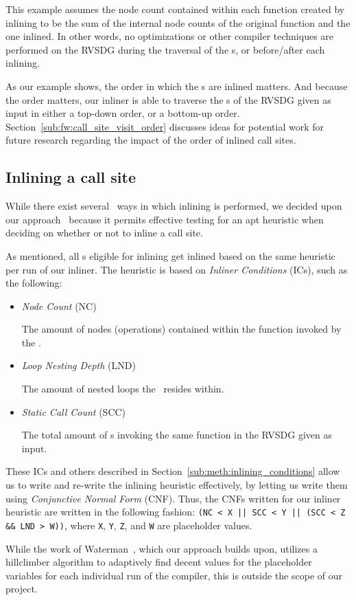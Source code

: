 This example assumes the node count contained within each function created by
inlining to be the sum of the internal node counts of the original function and
the one inlined. In other words, no optimizations or other compiler techniques
are performed on the RVSDG during the traversal of the \applyNode s, or
before/after each inlining.

As our example shows, the order in which the \applyNode s are inlined matters.
And because the order matters, our inliner is able to traverse the \applyNode s
of the RVSDG given as input in either a top-down order, or a bottom-up order.
Section~\ref{sub:fw:call_site_visit_order} discusses ideas for potential work
for future research regarding the impact of the order of inlined call sites.

\subsection{Inlining a call site}
\label{sub:scheme:inlining_apply_nodes}

While there exist several~\cite{GHCPaper,AdaptvStratInlSubst} ways in which
inlining is performed, we decided upon our
approach~\cite{AdaptvCompilAndInlingWaterman} because it permits effective
testing for an apt heuristic when deciding on whether or not to inline a call
site.

As mentioned, all \applyNode s eligible for inlining get inlined based on the
same heuristic per run of our inliner. The heuristic is based on \textit{Inliner
Conditions} (ICs), such as the following:

\begin{itemize}
	\item \textit{Node Count} (NC)

The amount of nodes (operations) contained within the function invoked by the
\applyNode .

	\item \textit{Loop Nesting Depth} (LND)

The amount of nested loops the \applyNode~resides within.

	\item \textit{Static Call Count} (SCC)

The total amount of \applyNode s invoking the same function in the RVSDG given
as input.
\end{itemize}

These ICs and others described in Section~\ref{sub:meth:inlining_conditions}
allow us to write and re-write the inlining heuristic effectively, by letting us
write them using \textit{Conjunctive Normal Form} (CNF). Thus, the CNFs written
for our inliner heuristic are written in the following fashion:
\lstinline"(NC < X || SCC < Y || (SCC < Z && LND > W))", where \lstinline!X!,
\lstinline!Y!, \lstinline!Z!, and \lstinline!W! are placeholder values.

While the work of Waterman~\cite{AdaptvCompilAndInlingWaterman}, which our
approach builds upon, utilizes a hillclimber algorithm to adaptively find decent
values for the placeholder variables for each individual run of the compiler,
this is outside the scope of our project.
